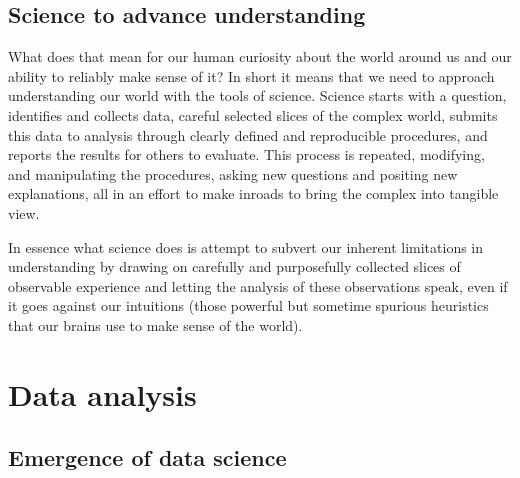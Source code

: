 \documentclass[
  letterpaper,
]{latex/krantz}
\begin{document}
\hypertarget{science-to-advance-understanding}{%
\subsection{Science to advance
understanding}\label{science-to-advance-understanding}}

What does that mean for our human curiosity about the world around us
and our ability to reliably make sense of it? In short it means that we
need to approach understanding our world with the tools of science.
Science starts with a question, identifies and collects data, careful
selected slices of the complex world, submits this data to analysis
through clearly defined and reproducible procedures, and reports the
results for others to evaluate. This process is repeated, modifying, and
manipulating the procedures, asking new questions and positing new
explanations, all in an effort to make inroads to bring the complex into
tangible view.

In essence what science does is attempt to subvert our inherent
limitations in understanding by drawing on carefully and purposefully
collected slices of observable experience and letting the analysis of
these observations speak, even if it goes against our intuitions (those
powerful but sometime spurious heuristics that our brains use to make
sense of the world).

\hypertarget{data-analysis}{%
\section{Data analysis}\label{data-analysis}}

\hypertarget{emergence-of-data-science}{%
\subsection{Emergence of data science}\label{emergence-of-data-science}}
\end{document}
